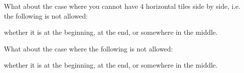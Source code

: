 \newpage
\newpage
\newpage
\newpage



\newpage
\begin{ex}
  What about the case where you cannot have 4 horizontal tiles side by side,
  i.e. the following is not allowed:

whether it is at the beginning, at the end, or somewhere in the middle.
\end{ex}

\begin{ex}
  What about the case where the following is not allowed:

whether it is at the beginning, at the end, or somewhere in the middle.
\end{ex}
